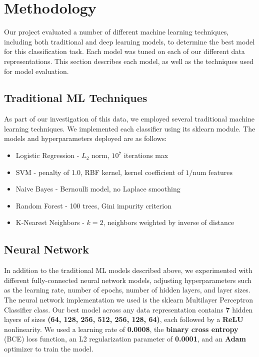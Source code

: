 \documentclass[10pt,twocolumn,letterpaper]{article}
\begin{document}
\section{Methodology}

Our project evaluated a number of different machine learning techniques, including both traditional and deep learning models, to determine the best model for this classification task. Each model was tuned on each of our different data representations. This section describes each model, as well as the techniques used for model evaluation.

\subsection{Traditional ML Techniques}

As part of our investigation of this data, we employed several traditional machine learning techniques. We implemented each classifier using its sklearn module. The models and hyperparameters deployed are as follows:
\begin{itemize}
    \item Logistic Regression - $L_2$ norm, $10^7$ iterations max
    \item SVM - penalty of 1.0, RBF kernel, kernel coefficient of $1/{\text{num features}}$
    \item Naive Bayes - Bernoulli model, no Laplace smoothing
    \item Random Forest - 100 trees, Gini impurity criterion
    \item K-Nearest Neighbors - $k = 2$, neighbors weighted by inverse of distance
\end{itemize}

\subsection{Neural Network}

In addition to the traditional ML models described above, we experimented with different fully-connected neural network models, adjusting hyperparameters such as the learning rate, number of epochs, number of hidden layers, and layer sizes. The neural network implementation we used is the sklearn Multilayer Perceptron Classifier class. Our best model across any data representation contains \textbf{7} hidden layers of sizes \textbf{(64, 128, 256, 512, 256, 128, 64)}, each followed by a \textbf{ReLU} nonlinearity. We used a learning rate of \textbf{0.0008}, the \textbf{binary cross entropy} (BCE) loss function, an L2 regularization parameter of \textbf{0.0001}, and an \textbf{Adam} optimizer to train the model.
\end{document}
